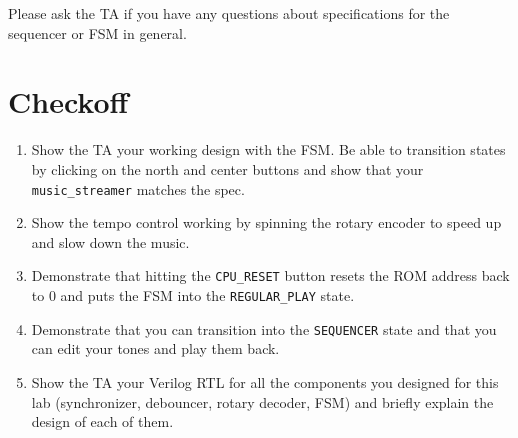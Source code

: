 \documentclass[11pt]{article}
\begin{document}
Please ask the TA if you have any questions about specifications for the sequencer or FSM in general.

\section{Checkoff}

\begin{enumerate}
	\item Show the TA your working design with the FSM. Be able to transition states by clicking on the north and center buttons and show that your \verb|music_streamer| matches the spec.
	
	\item Show the tempo control working by spinning the rotary encoder to speed up and slow down the music.
	
	\item Demonstrate that hitting the \verb|CPU_RESET| button resets the ROM address back to 0 and puts the FSM into the \verb|REGULAR_PLAY| state.
	
	\item Demonstrate that you can transition into the \verb|SEQUENCER| state and that you can edit your tones and play them back. 
	
	\item Show the TA your Verilog RTL for all the components you designed for this lab (synchronizer, debouncer, rotary decoder, FSM) and briefly explain the design of each of them.
\end{enumerate}
\end{document}
